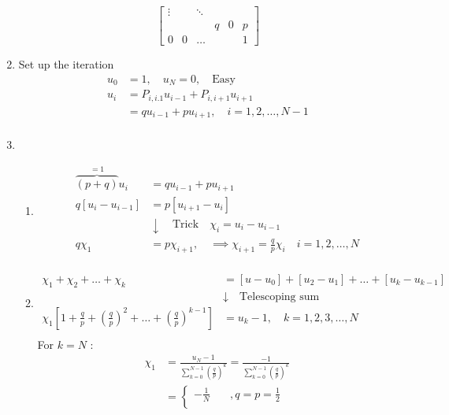 \documentclass{article}
\theoremstyle{remark}
\begin{document}
\begin{enumerate}
\[\begin{bmatrix}
     \vdots   &  &   \ddots    \\
      &  &  & q  & 0  &  p \\
     0  &  0  &  \ldots  &   &  & 1
     \end{bmatrix} 
     \] 
   \item Set up the iteration \[
   \begin{split}
     u _{0}  & = 1 , \quad  u_{N} = 0 , \quad  \text{Easy}   \\
     u_{i} &=  P_{i, i.1} u_{i-1} + P _{i,i+1} u_{i+1}  \\
     &= q u_{i-1} + p u_{i+1} , \quad i=1,2, \ldots, N-1  \\
   \end{split} 
   \] 
 \item 
   \begin{enumerate}
     \item  \[
         \begin{split}
           \overbrace{(p + q)}^{ = 1} u_{i}   & = q u_{i -1} + p u_{i+1} \\
    q\left[ u _{ i} - u_{i-1} \right] &=  p \left[ u_{i+1} - u_{i} \right] \\
      &  \downarrow \quad \text{Trick}    \quad \chi _{i} = u_{i} - u_{i-1}   \\
    q \chi _{1} &=  p \chi _{i+1} , \quad  \implies  \chi _{i+1} = \frac{q}{p}  \chi _{i}  \quad  i = 1,2 , \ldots , N  \\
         \end{split} 
     \] 
   \item \[
   \begin{split}
     \chi _{1} + \chi _{2} + \ldots + \chi _{k} &= \left[ u - u_{0} \right] + \left[ u_{2} - u_{1} \right] + \ldots + \left[ u_{k} - u_{k-1} \right] \\
       &  \downarrow  \quad \text{Telescoping sum}  \\
        \chi _{1}\left[ 1 + \frac{q}{p} + \left( \frac{q}{p} \right)^2 + \ldots + \left( \frac{q}{p} \right)^{k-1}  \right]&=  u_{k} -1, \quad k = 1,2,3,\ldots,N  \\
   \end{split} 
   \] 
   For $k = N$ : \[
   \begin{split}
     \chi _{1} &=    \frac{u_{N} -1}{\sum_{k=0}^{N-1} \left( \frac{q}{p} \right)^{k}}  = \frac{-1}{ \sum_{k = 0}^{N-1}  \left( \frac{q}{p} \right)^{k}}   \\
     &= \begin{cases}
       -\frac{1}{N}\quad   & , q = p = \frac{1}{2} \\

\end{cases}
\end{split}\]
\end{enumerate}
\end{enumerate}
\end{document}
